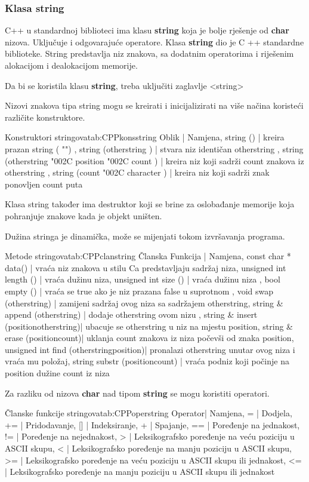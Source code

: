 \documentclass[11pt]{book}
\begin{document}
\subsubsection{Klasa string}
C++ u standardnoj biblioteci ima klasu \textbf{string} koja je bolje rješenje od \textbf{char} nizova. Uključuje i odgovarajuće operatore. Klasa \textbf{string} dio je C ++ standardne biblioteke. String predstavlja niz znakova, sa dodatnim operatorima i riješenim alokacijom i dealokacijom memorije.

Da bi se koristila klasu \textbf{string}, treba uključiti zaglavlje <string>

Nizovi znakova tipa string mogu se kreirati i inicijalizirati na više načina koristeći različite konstruktore.

 {Konstruktori stringova}{tab:CPPkonsstring}
{
  Oblik | Namjena,
  string () | kreira prazan string ( "") ,
  string (otherstring ) | stvara niz identičan otherstring ,
  string (otherstring \char"002C position \char"002C count ) | kreira niz koji sadrži count znakova iz otherstring ,
  string (count \char"002C character ) | kreira niz koji sadrži znak ponovljen count puta
}

Klasa string također ima destruktor koji se brine za oslobađanje memorije koja pohranjuje znakove kada je objekt uništen.

Dužina stringa je dinamička, može se mijenjati tokom izvršavanja programa.

 {Metode stringova}{tab:CPPclanstring}
{
  Članska Funkcija | Namjena,
  const char * data() | vraća niz znakova u stilu C\com a predstavljaju sadržaj niza,
  unsigned int length () | vraća dužinu niza,
  unsigned int size () | vraća dužinu niza ,
  bool empty () | vraća se true ako je niz prazan\com a false u suprotnom ,
  void swap (otherstring) | zamijeni sadržaj ovog niza sa sadržajem otherstring,
  string \& append (otherstring) | dodaje otherstring ovom nizu ,
  string \& insert (position\com otherstring)| ubacuje se otherstring u niz na mjestu position,
  string \& erase (position\com count)| uklanja count znakova iz niza počevši od znaka  position,
  unsigned int find (otherstring\com position)| pronalazi otherstring unutar ovog niza i vraća mu položaj,
  string substr (position\com count) | vraća podniz koji počinje na position dužine count iz niza
}

Za razliku od nizova \textbf{char} nad tipom \textbf{string} se mogu koristiti operatori.

 {Članske funkcije stringova}{tab:CPPoperstring}
{
  Operator| Namjena,
  =   | Dodjela,
  +=  | Pridodavanje,
    [] | Indeksiranje,
  +  | Spajanje,
  == | Poređenje na jednakost,
  !=  | Poređenje na nejednakost,
  >   | Leksikografsko poređenje na veću poziciju u ASCII skupu,
  <   | Leksikografsko poređenje na manju poziciju u ASCII skupu,
  >=  | Leksikografsko poređenje na veću poziciju u ASCII skupu ili jednakost,
  <=  | Leksikografsko poređenje na manju poziciju u ASCII skupu ili jednakost
}
\end{document}
